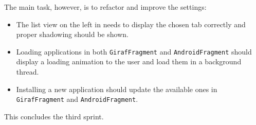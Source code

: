 The main task, however, is to refactor and improve the settings:

\begin{itemize}
\item The list view on the left in \settingsactivity needs to display the chosen tab correctly and proper shadowing should be shown.
\item Loading applications in both \lstinline!GirafFragment! and \lstinline!AndroidFragment! should display a loading animation to the user and load them in a background thread.
\item Installing a new application should update the available ones in \lstinline!GirafFragment! and \lstinline!AndroidFragment!.
\end{itemize}

This concludes the third sprint.